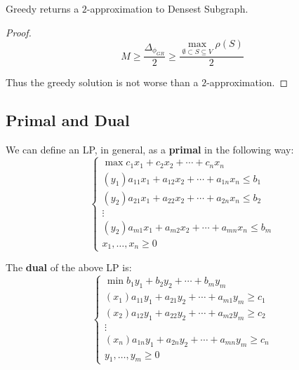     \begin{corollary}
        Greedy returns a $2$-approximation to Densest Subgraph.
    \end{corollary}

    \begin{proof}
        \[ M \geq \dfrac{\Delta_{\phi_{GR}}}{2} \geq \dfrac{\max_{\emptyset \subset S \subseteq V} \rho(S)}{2} \]

        Thus the greedy solution is not worse than a $2$-approximation.
    \end{proof}


\subsection{Primal and Dual}

    We can define an LP, in general, as a \textbf{primal} in the following way:
    \begin{equation}
        \begin{cases}
            \max c_1 x_1 + c_2 x_2 + \cdots + c_n x_n\\
            (y_1) a_{11} x_1 + a_{12} x_2 + \cdots + a_{1n} x_n \leq b_1\\
            (y_2) a_{21} x_1 + a_{22} x_2 + \cdots + a_{2n} x_n \leq b_2\\
            \vdots\\
            (y_2) a_{m1} x_1 + a_{m2} x_2 + \cdots + a_{mn} x_n \leq b_m\\
            x_1, \dots, x_n \geq 0
        \end{cases}
    \end{equation}

    The \textbf{dual} of the above LP is:
    \begin{equation}
        \begin{cases}
            \min b_1 y_1 + b_2 y_2 + \cdots + b_m y_m\\
            (x_1) a_{11} y_1 + a_{21} y_2 + \cdots + a_{m1} y_m \geq c_1\\
            (x_2) a_{12} y_1 + a_{22} y_2 + \cdots + a_{m2} y_m \geq c_2\\
            \vdots\\
            (x_n) a_{1n} y_1 + a_{2n} y_2 + \cdots + a_{mn} y_m \geq c_n\\
            y_1, \dots, y_m \geq 0
        \end{cases}
    \end{equation}

